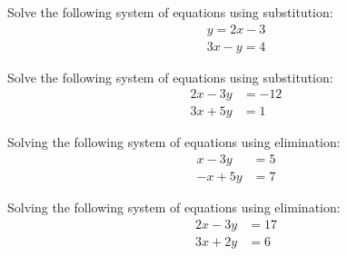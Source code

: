 \documentclass[11pt,letterpaper]{article}
\begin{document}

 Solve the following system of equations using substitution:
	\[
	\begin{aligned}
	y= 2x - 3 \\
	3x - y= 4
	\end{aligned}
	\]





\newpage





 Solve the following system of equations using substitution: 
	\[
	\begin{aligned}
	2x - 3y&= -12 \\
	3x + 5y&= 1
	\end{aligned}
	\]





\newpage





 Solving the following system of equations using elimination: 
	\[
	\begin{aligned}
	x - 3y&= 5 \\
	-x + 5y&= 7
	\end{aligned}
	\]





\newpage





 Solving the following system of equations using elimination:  
	\[
	\begin{aligned}
	2x - 3y&= 17 \\
	3x + 2y&= 6
	\end{aligned}
	\]


\end{document}
